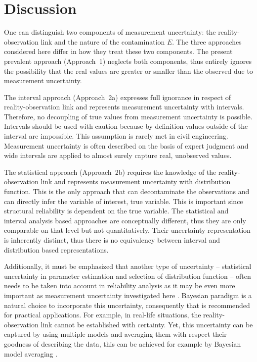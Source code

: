 \section{Discussion}
\label{sec:discussion_mu}
One can distinguish two components of measurement uncertainty: the reality-observation link and the nature of the contamination $E$. The three approaches considered here differ in how they treat these two components. The present prevalent approach (Approach~1) neglects both components, thus entirely ignores the possibility that the real values are greater or smaller than the observed due to measurement uncertainty.

The interval approach (Approach~2a) expresses full ignorance in respect of reality-observation link and represents measurement uncertainty with intervals. Therefore, no decoupling of true values from measurement uncertainty is possible. Intervals should be used with caution because by definition values outside of the interval are impossible. This assumption is rarely met in civil engineering. Measurement uncertainty is often described on the basis of expert judgment and wide intervals are applied to almost surely capture real, unobserved values.

The statistical approach (Approach~2b) requires the knowledge of the reality-observation link and represents measurement uncertainty with distribution function. This is the only approach that can decontaminate the observations and can directly infer the variable of interest, true variable. This is important since structural reliability is dependent on the true variable. The statistical and interval analysis based approaches are conceptually different, thus they are only comparable on that level but not quantitatively. Their uncertainty representation is inherently distinct, thus there is no equivalency between interval and distribution based representations.

Additionally, it must be emphasized that another type of uncertainty – statistical uncertainty in parameter estimation and selection of distribution function – often needs to be taken into account in reliability analysis as it may be even more important as measurement uncertainty investigated here \citep{RozsasIABSE2015, RozsasESREL2015}. Bayesian paradigm is a natural choice to incorporate this uncertainty, consequently that is recommended for practical applications. For example, in real-life situations, the reality-observation link cannot be established with certainty. Yet, this uncertainty can be captured by using multiple models and averaging them with respect their goodness of describing the data, this can be achieved for example by Bayesian model averaging \citep{Hoeting1999}.

